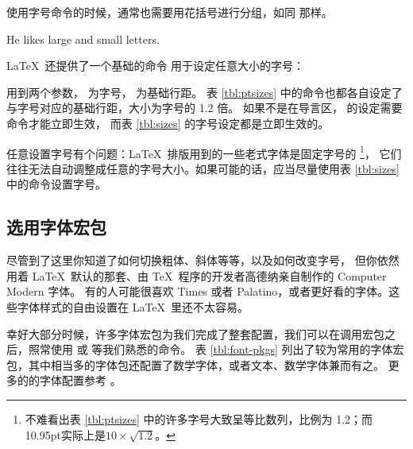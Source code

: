 使用字号命令的时候，通常也需要用花括号进行分组，如同  那样。
\begin{example}
He likes {\LARGE large and
{\small small} letters}.
\end{example}

\LaTeX\ 还提供了一个基础的命令  用于设定任意大小的字号：
\begin{command}
\end{command}

 用到两个参数， 为字号， 为基础行距。
表 \ref{tbl:ptsizes} 中的命令也都各自设定了与字号对应的基础行距，大小为字号的 1.2 倍。
如果不是在导言区， 的设定需要  命令才能立即生效，
而表 \ref{tbl:sizes} 的字号设定都是立即生效的。

任意设置字号有个问题：\LaTeX\ 排版用到的一些老式字体是固定字号的%
\footnote{不难看出表 \ref{tbl:ptsizes} 中的许多字号大致呈等比数列，比例为 1.2；而10.95pt实际上是$10\times\sqrt{1.2}$。}，
它们往往无法自动调整成任意的字号大小。如果可能的话，应当尽量使用表 \ref{tbl:sizes} 中的命令设置字号。

\subsection{选用字体宏包}\label{subsec:font-pkgs}

尽管到了这里你知道了如何切换粗体、斜体等等，以及如何改变字号，
但你依然用着 \LaTeX\ 默认的那套、由 \TeX\ 程序的开发者高德纳亲自制作的 Computer Modern 字体。
有的人可能很喜欢 Times 或者 Palatino，或者更好看的字体。这些字体样式的自由设置在 \LaTeX\ 里还不太容易。

幸好大部分时候，许多字体宏包为我们完成了整套配置，我们可以在调用宏包之后，照常使用  或  等我们熟悉的命令。
表 \ref{tbl:font-pkgs} 列出了较为常用的字体宏包，其中相当多的字体包还配置了数学字体，或者文本、数学字体兼而有之。
更多的的字体配置参考 \cite{survey,fontcatalogue}。

